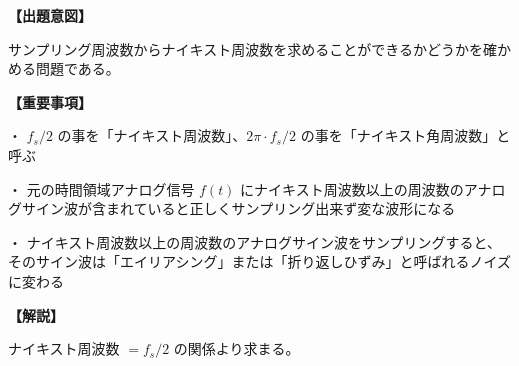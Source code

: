 \noindent \textbf{【出題意図】}

\noindent サンプリング周波数からナイキスト周波数を求めることができるかどうかを確かめる問題である。

\vspace{1em}
\noindent \textbf{【重要事項】}

\medskip
\noindent ・ $f_s/2$ の事を「ナイキスト周波数」、$2\pi \cdot f_s/2$ の事を「ナイキスト角周波数」と呼ぶ

\medskip
\noindent ・ 元の時間領域アナログ信号 $f(t)$ にナイキスト周波数以上の周波数のアナログサイン波が含まれていると正しくサンプリング出来ず変な波形になる

\medskip
\noindent ・ ナイキスト周波数以上の周波数のアナログサイン波をサンプリングすると、そのサイン波は「エイリアシング」または「折り返しひずみ」と呼ばれるノイズに変わる

\vspace{1em}
\noindent \textbf{【解説】}

\noindent ナイキスト周波数 $ = f_s/2$ の関係より求まる。
